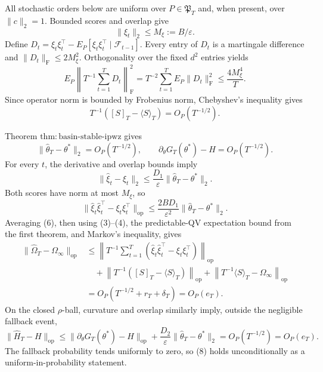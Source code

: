 All stochastic orders below are uniform over \(P\in\mathfrak P_T\) and, when present, over \(\|c\|_2=1\). Bounded scores and overlap give
\[
 \|\xi_t\|_2\le M_\xi:=B/\varepsilon. \tag{1}
\]
Define \(D_t=\xi_t\xi_t^\top-E_P[\xi_t\xi_t^\top\mid\mathcal F_{t-1}]\). Every entry of \(D_t\) is a martingale difference and \(\|D_t\|_{\mathrm F}\le2M_\xi^2\). Orthogonality over the fixed \(d^2\) entries yields
\[
 E_P\left\|T^{-1}\sum_{t=1}^TD_t\right\|_{\mathrm F}^2
 =T^{-2}\sum_{t=1}^TE_P\|D_t\|_{\mathrm F}^2
 \le\frac{4M_\xi^4}{T}. \tag{2}
\]
Since operator norm is bounded by Frobenius norm, Chebyshev's inequality gives
\[
 T^{-1}([S]_T-\langle S\rangle_T)=O_P(T^{-1/2}). \tag{3}
\]

Theorem \(\mathrm{thm:basin\text{-}stable\text{-}ipwz}\) gives
\[
 \|\widehat\theta_T-\theta^*\|_2=O_P(T^{-1/2}),
 \qquad \partial_\theta G_T(\theta^*)-H=O_P(T^{-1/2}). \tag{4}
\]
For every \(t\), the derivative and overlap bounds imply
\[
 \|\widehat\xi_t-\xi_t\|_2
 \le\frac{D_1}{\varepsilon}\|\widehat\theta_T-\theta^*\|_2. \tag{5}
\]
Both scores have norm at most \(M_\xi\), so
\[
 \|\widehat\xi_t\widehat\xi_t^\top-\xi_t\xi_t^\top\|_{\mathrm{op}}
 \le\frac{2BD_1}{\varepsilon^2}\|\widehat\theta_T-\theta^*\|_2. \tag{6}
\]
Averaging (6), then using (3)--(4), the predictable-QV expectation bound from the first theorem, and Markov's inequality, gives
\[
\begin{aligned}
 \|\widehat\Omega_T-\Omega_\infty\|_{\mathrm{op}}
 &\le\left\|T^{-1}\sum_{t=1}^T
 (\widehat\xi_t\widehat\xi_t^\top-\xi_t\xi_t^\top)\right\|_{\mathrm{op}}\\
 &\quad+\left\|T^{-1}([S]_T-\langle S\rangle_T)\right\|_{\mathrm{op}}
 +\left\|T^{-1}\langle S\rangle_T-\Omega_\infty\right\|_{\mathrm{op}}\\
 &=O_P(T^{-1/2}+r_T+\delta_T)=O_P(e_T). \tag{7}
\end{aligned}
\]
On the closed \(\rho\)-ball, curvature and overlap similarly imply, outside the negligible fallback event,
\[
 \|\widehat H_T-H\|_{\mathrm{op}}
 \le\|\partial_\theta G_T(\theta^*)-H\|_{\mathrm{op}}
 +\frac{D_2}{\varepsilon}\|\widehat\theta_T-\theta^*\|_2
 =O_P(T^{-1/2})=O_P(e_T). \tag{8}
\]
The fallback probability tends uniformly to zero, so (8) holds unconditionally as a uniform-in-probability statement.

